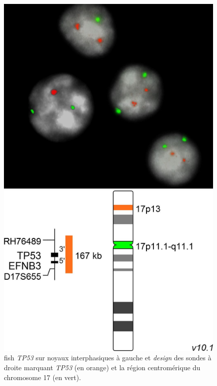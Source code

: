 \begin{figure}[H]
    \begin{minipage}{0.45\textwidth}
        \centering
        \includegraphics[width=1\textwidth]{images/fish_image.png}
    \end{minipage}
    \hfill
    \begin{minipage}{0.45\textwidth}
        \centering
        \includegraphics[width=01\textwidth]{images/fish.png}
    \end{minipage}
    \caption{
        \gls{fish} \textit{TP53} sur noyaux interphasiques à gauche et \textit{design} des sondes à droite 
        marquant \colorbox{orange!50}{\textit{TP53} (en orange)} et \colorbox{green!50}{la région centromérique 
        du chromosome 17 (en vert)}.
    }
    \label{fig:fish}
\end{figure}

